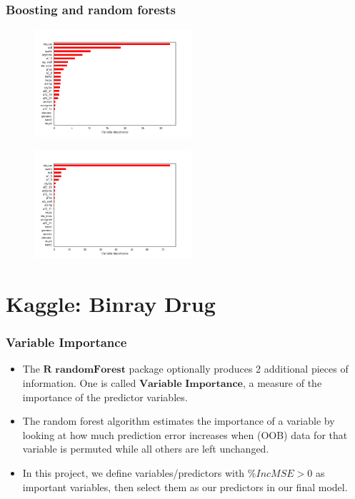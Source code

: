 \documentclass{beamer}
\begin{document}
\begin{frame}
\frametitle{Boosting and random forests}
\begin{figure}
\centering
\begin{minipage}{.5\textwidth}
  \centering
  \includegraphics[width=.8\linewidth,height=4cm]{crime_boosttu}
  \label{fig:test1}
\end{minipage}%
\begin{minipage}{.5\textwidth}
  \centering
  \includegraphics[width=.8\linewidth,height=4cm]{crime_randtu}
  \label{fig:test2}
\end{minipage}
\end{figure}
\end{frame}


\section{Kaggle: Binray Drug}
\begin{frame}
\frametitle{Variable Importance}
\begin{itemize}
\item The $\textbf{R randomForest}$ package optionally produces 2 additional pieces of information. One is called $\textbf{Variable Importance}$, a measure of the importance of the predictor variables.

\item The random forest algorithm estimates the importance of a variable by looking at how much prediction error increases when (OOB) data for that variable is permuted while all others are left unchanged.

\item In this project, we define variables/predictors with $\%IncMSE > 0 $ as important variables, then select them as our predictors in our final model.	
\end{itemize}
\end{frame}
\end{document}
